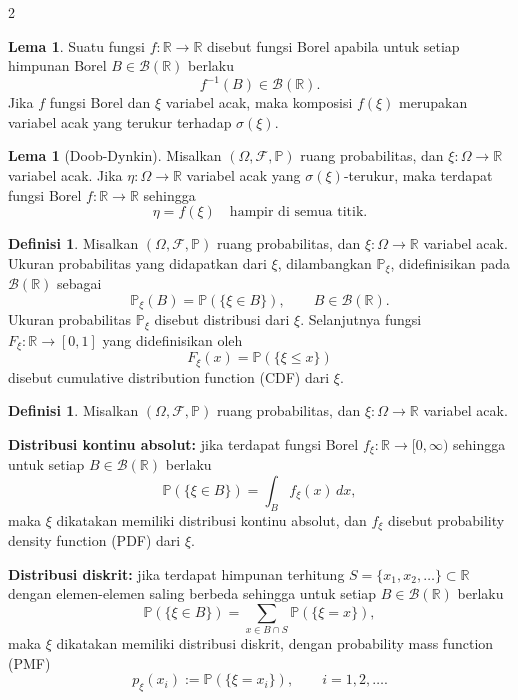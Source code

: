 \documentclass[a4paper,extrafontsizes, 9pt]{memoir}
\theoremstyle{definition}
\newtheorem{definisi}[kalstok]{Definisi}
\newtheorem{lemma}[kalstok]{Lema}
\theoremstyle{plain}
\theoremstyle{remark}
\begin{document}
\begin{multicols}{2}
  \begin{lemma}
    Suatu fungsi $f:\mathbb{R}\to\mathbb{R}$ disebut fungsi Borel apabila untuk setiap himpunan Borel
    $B\in\mathcal{B}(\mathbb{R})$ berlaku
    \[f^{-1}(B)\in\mathcal{B}(\mathbb{R}).\]
    Jika $f$ fungsi Borel dan $\xi$ variabel acak, maka komposisi $f(\xi)$ merupakan variabel acak
    yang terukur terhadap $\sigma(\xi)$.
  \end{lemma}

  \begin{lemma}[Doob-Dynkin]
    Misalkan $(\Omega,\mathcal{F},\mathbb{P})$ ruang probabilitas, dan $\xi:\Omega\to\mathbb{R}$
    variabel acak. Jika $\eta:\Omega\to\mathbb{R}$ variabel acak yang $\sigma(\xi)$-terukur,
    maka terdapat fungsi Borel $f:\mathbb{R}\to\mathbb{R}$ sehingga
    \[\eta=f(\xi)\quad\text{hampir di semua titik}.\]
  \end{lemma}

  \begin{definisi}
    Misalkan $(\Omega,\mathcal{F},\mathbb{P})$ ruang probabilitas, dan $\xi:\Omega\to\mathbb{R}$ variabel acak.
    Ukuran probabilitas yang didapatkan dari $\xi$, dilambangkan $\mathbb{P}_{\xi}$,
    didefinisikan pada $\mathcal{B}(\mathbb{R})$ sebagai
    \[\mathbb{P}_{\xi}(B)=\mathbb{P}(\{\xi\in B\}),\qquad B\in\mathcal{B}(\mathbb{R}).\]
    Ukuran probabilitas $\mathbb{P}_{\xi}$ disebut distribusi dari $\xi$.
    Selanjutnya fungsi $F_{\xi}:\mathbb{R}\to[0,1]$ yang didefinisikan oleh
    \[F_{\xi}(x)=\mathbb{P}(\{\xi\le x\})\]
    disebut cumulative distribution function (CDF) dari $\xi$.
  \end{definisi}

  \begin{definisi}
    Misalkan $(\Omega,\mathcal{F},\mathbb{P})$ ruang probabilitas, dan $\xi:\Omega\to\mathbb{R}$ variabel acak.

    \textbf{Distribusi kontinu absolut:} jika terdapat fungsi Borel
    $f_{\xi}:\mathbb{R}\to[0,\infty)$ sehingga untuk setiap $B\in\mathcal{B}(\mathbb{R})$ berlaku
    \[\mathbb{P}(\{\xi\in B\})=\int_B f_{\xi}(x)\,dx,\]
    maka $\xi$ dikatakan memiliki distribusi kontinu absolut, dan $f_{\xi}$ disebut
    probability density function (PDF) dari $\xi$.

    \textbf{Distribusi diskrit:} jika terdapat himpunan terhitung
    $S=\{x_1,x_2,\ldots\}\subset\mathbb{R}$ dengan elemen-elemen saling berbeda sehingga
    untuk setiap $B\in\mathcal{B}(\mathbb{R})$ berlaku
    \[\mathbb{P}(\{\xi\in B\})=\sum_{x\in B\cap S}\mathbb{P}(\{\xi=x\}),\]
    maka $\xi$ dikatakan memiliki distribusi diskrit, dengan probability mass function (PMF)
    \[p_{\xi}(x_i):=\mathbb{P}(\{\xi=x_i\}),\qquad i=1,2,\ldots.\]
  \end{definisi}


\end{multicols}
\end{document}
